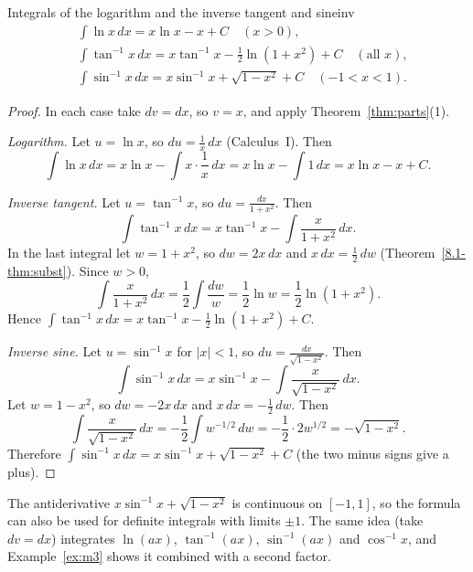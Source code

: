 \documentclass[11pt]{article}
\begin{document}
\begin{thm}{Integrals of the logarithm and the inverse tangent and sine}{inv}
\begin{align*}
&\int\ln x\,dx=x\ln x-x+C\quad(x>0),\\
&\int\tan^{-1}x\,dx=x\tan^{-1}x-\tfrac12\ln\left(1+x^2\right)+C\quad(\text{all }x),\\
&\int\sin^{-1}x\,dx=x\sin^{-1}x+\sqrt{1-x^2}+C\quad(-1<x<1).
\end{align*}
\end{thm}
\begin{proof}
In each case take $dv=dx$, so $v=x$, and apply Theorem~\ref{thm:parts}(1).

\emph{Logarithm.} Let $u=\ln x$, so $du=\frac1x\,dx$ (Calculus~I). Then
\[\int\ln x\,dx=x\ln x-\int x\cdot\frac1x\,dx=x\ln x-\int1\,dx=x\ln x-x+C .\]

\emph{Inverse tangent.} Let $u=\tan^{-1}x$, so $du=\frac{dx}{1+x^2}$. Then
\[\int\tan^{-1}x\,dx=x\tan^{-1}x-\int\frac{x}{1+x^2}\,dx .\]
In the last integral let $w=1+x^2$, so $dw=2x\,dx$ and $x\,dx=\frac12\,dw$ (Theorem~\ref{8.1-thm:subst}). Since $w>0$,
\[\int\frac{x}{1+x^2}\,dx=\frac12\int\frac{dw}{w}=\frac12\ln w=\frac12\ln\left(1+x^2\right).\]
Hence $\int\tan^{-1}x\,dx=x\tan^{-1}x-\frac12\ln\left(1+x^2\right)+C$.

\emph{Inverse sine.} Let $u=\sin^{-1}x$ for $\lvert x\rvert<1$, so $du=\frac{dx}{\sqrt{1-x^2}}$. Then
\[\int\sin^{-1}x\,dx=x\sin^{-1}x-\int\frac{x}{\sqrt{1-x^2}}\,dx .\]
Let $w=1-x^2$, so $dw=-2x\,dx$ and $x\,dx=-\frac12\,dw$. Then
\[\int\frac{x}{\sqrt{1-x^2}}\,dx=-\frac12\int w^{-1/2}\,dw=-\frac12\cdot2w^{1/2}=-\sqrt{1-x^2}.\]
Therefore $\int\sin^{-1}x\,dx=x\sin^{-1}x+\sqrt{1-x^2}+C$ (the two minus signs give a plus).
\end{proof}

The antiderivative $x\sin^{-1}x+\sqrt{1-x^2}$ is continuous on $[-1,1]$, so the formula can also be used for definite integrals with limits $\pm1$. The same idea (take $dv=dx$) integrates $\ln(ax)$, $\tan^{-1}(ax)$, $\sin^{-1}(ax)$ and $\cos^{-1}x$, and Example~\ref{ex:m3} shows it combined with a second factor.
\end{document}
